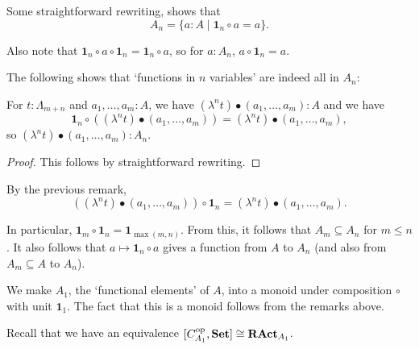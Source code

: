 \begin{remark}
  Some straightforward rewriting, shows that
  \[ A_n = \{ a : A \mid \mathbf 1_n \circ a = a \}. \]
\end{remark}

\begin{remark}
  Also note that $ \mathbf 1_n \circ a \circ \mathbf 1_n = \mathbf 1_n \circ a $, so for $ a : A_n $, $ a \circ \mathbf 1_n = a $.
\end{remark}

The following shows that `functions in $ n $ variables' are indeed all in $ A_n $:
\begin{lemma}
  For $ t: \Lambda_{m + n} $ and $ a_1, \dots, a_m: A $, we have $ (\lambda^n t) \bullet (a_1, \dots, a_m) : A $ and we have
  \[ \mathbf 1_n \circ ((\lambda^n t) \bullet (a_1, \dots, a_m)) = (\lambda^n t) \bullet (a_1, \dots, a_m), \]
  so $ (\lambda^n t) \bullet (a_1, \dots, a_m) : A_n $.
\end{lemma}
\begin{proof}
  This follows by straightforward rewriting.
\end{proof}

\begin{corollary}
  By the previous remark,
  \[ ((\lambda^n t) \bullet (a_1, \dots, a_m)) \circ \mathbf 1_n = (\lambda^n t) \bullet (a_1, \dots, a_m). \]
\end{corollary}
\begin{corollary}
  In particular, $ \mathbf 1_m \circ \mathbf 1_n = \mathbf 1_{\max(m, n)} $. From this, it follows that $ A_m \subseteq A_n $ for $ m \leq n $. It also follows that $ a \mapsto \mathbf 1_n \circ a $ gives a function from $ A $ to $ A_n $ (and also from $ A_m \subseteq A $ to $ A_n $).
\end{corollary}

\begin{definition}
  We make $ A_1 $, the `functional elements' of $ A $, into a monoid under composition $ \circ $ with unit $ \mathbf 1_1 $. The fact that this is a monoid follows from the remarks above.
\end{definition}

Recall that we have an equivalence $ [C_{A_1}^{\text{op}}, \mathbf{Set}] \cong \mathbf{RAct}_{A_1} $.

